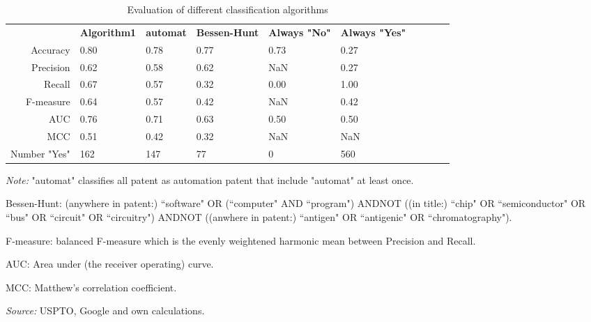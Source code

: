 \begin{table}
\begin{small}
\begin{threeparttable}
\caption{{\normalsize Evaluation of different classification algorithms}}
\label{table:table_compare_classalg}
\begin{tabular}{rlllllllll}
\toprule 
 & \textbf{Algorithm1} & \textbf{automat} & \textbf{Bessen-Hunt} & \textbf{Always "No"} & \textbf{Always "Yes"}  \tabularnewline 
Accuracy & 0.80 & 0.78 & 0.77 & 0.73 & 0.27 & & & &  \tabularnewline 
Precision & 0.62 & 0.58 & 0.62 & NaN & 0.27 & & & &  \tabularnewline 
Recall & 0.67 & 0.57 & 0.32 & 0.00 & 1.00 & & & &  \tabularnewline 
F-measure & 0.64 & 0.57 & 0.42 & NaN & 0.42 & & & &  \tabularnewline 
AUC & 0.76 & 0.71 & 0.63 & 0.50 & 0.50 & & & &  \tabularnewline 
MCC & 0.51 & 0.42 & 0.32 & NaN & NaN & & & &  \tabularnewline 
Number "Yes" & 162 & 147 & 77 & 0 & 560 & & & &  \tabularnewline 
\bottomrule 
\end{tabular} 
\begin{tablenotes}
\small
\item\textit{Note:} "automat" classifies all patent as automation patent that include "automat" at least once.\item Bessen-Hunt: (anywhere in patent:) ``software" OR (``computer" AND ``program") ANDNOT ((in title:) ``chip" OR ``semiconductor" OR ``bus" OR ``circuit" OR ``circuitry") ANDNOT ((anwhere in patent:) ``antigen" OR ``antigenic" OR ``chromatography").
\item F-measure: balanced F-measure which is the evenly weightened harmonic mean between Precision and Recall. 
\item AUC: Area under (the receiver operating) curve.
\item MCC: Matthew's correlation coefficient.
\item\textit{Source:} USPTO, Google and own calculations.
\end{tablenotes}
\end{threeparttable}
\end{small}
\end{table}
